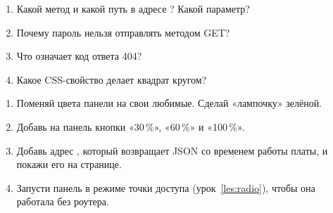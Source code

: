 \begin{quiz}
\begin{enumerate}
  \item Какой метод и какой путь в адресе ? Какой параметр?
  \item Почему пароль нельзя отправлять методом GET?
  \item Что означает код ответа 404?
  \item Какое CSS-свойство делает квадрат кругом?
\end{enumerate}
\end{quiz}

\begin{tasks}
\begin{enumerate}
  \item Поменяй цвета панели на свои любимые. Сделай «лампочку» зелёной.
  \item Добавь на панель кнопки «30\,\%», «60\,\%» и «100\,\%».
  \item Добавь адрес , который возвращает JSON со временем работы платы, и покажи его на странице.
  \item Запусти панель в режиме точки доступа (урок~\ref{les:radio}), чтобы она работала без роутера.
\end{enumerate}
\end{tasks}
